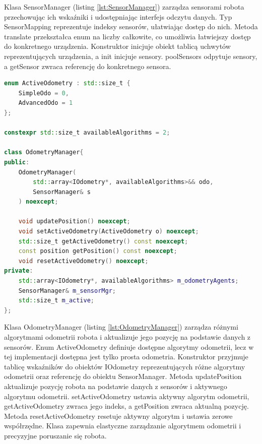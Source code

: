 \documentclass[12pt,twoside]{article}
\begin{document}
Klasa SensorManager (listing \ref{lst:SensorManager}) zarządza sensorami robota przechowując ich wskaźniki i udostępniając interfejs odczytu danych. Typ SensorMapping reprezentuje indeksy sensorów, ułatwiając dostęp do nich. Metoda translate przekształca enum na liczby całkowite, co umożliwia łatwiejszy dostęp do konkretnego urządzenia. Konstruktor inicjuje obiekt tablicą uchwytów reprezentujących urządzenia, a init inicjuje sensory. poolSensors odpytuje sensory, a getSensor zwraca referencję do konkretnego sensora.

\newpage

\begin{lstlisting}[language=C++, caption={Klasa OdometryManager}, label={lst:OdometryManager}]
enum ActiveOdometry : std::size_t {
    SimpleOdo = 0,
    AdvancedOdo = 1
};

constexpr std::size_t availableAlgorithms = 2;

class OdometryManager{
public:
    OdometryManager(
        std::array<IOdometry*, availableAlgorithms>&& odo,
        SensorManager& s
    ) noexcept;

    void updatePosition() noexcept;
    void setActiveOdometry(ActiveOdometry o) noexcept;
    std::size_t getActiveOdometry() const noexcept;
    const position getPosition() const noexcept;
    void resetActiveOdometry() noexcept;
private:
    std::array<IOdometry*, availableAlgorithms> m_odometryAgents;
    SensorManager& m_sensorMgr;
    std::size_t m_active;
};
\end{lstlisting}

Klasa OdometryManager (listing \ref{lst:OdometryManager}) zarządza różnymi algorytmami odometrii robota i aktualizuje jego pozycję na podstawie danych z sensorów. Enum ActiveOdometry definiuje dostępne algorytmy odometrii, lecz w tej implementacji dostępna jest tylko prosta odometria. Konstruktor przyjmuje tablicę wskaźników do obiektów IOdometry reprezentujących różne algorytmy odometrii oraz referencję do obiektu SensorManager. Metoda updatePosition aktualizuje pozycję robota na podstawie danych z sensorów i aktywnego algorytmu odometrii. setActiveOdometry ustawia aktywny algorytm odometrii, getActiveOdometry zwraca jego indeks, a getPosition zwraca aktualną pozycję. Metoda resetActiveOdometry resetuje aktywny algorytm i ustawia zerowe współrzędne. Klasa zapewnia elastyczne zarządzanie algorytmem odometrii i precyzyjne poruszanie się robota.
\end{document}
